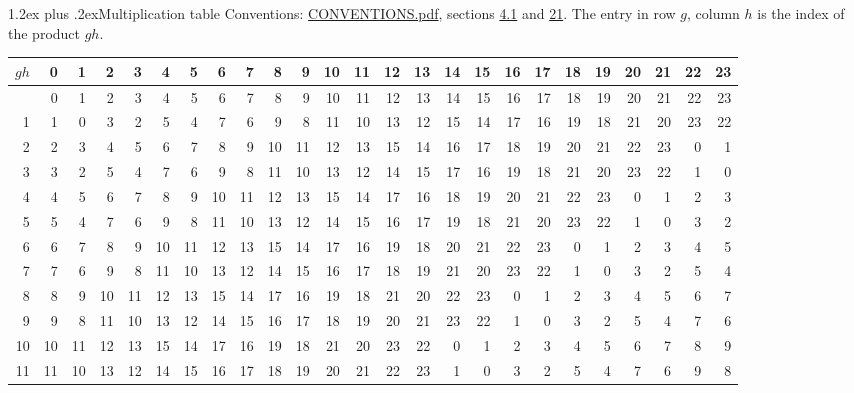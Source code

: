 \documentclass[10pt,a4paper]{article}
\makeatletter
\renewcommand\section{\@startsection{section}{1}{\z@}{-3ex plus -1ex minus -.2ex}%
  {1.2ex plus .2ex}{\normalfont\large\sffamily\bfseries\color{parttitle}}}
\numberwithin{equation}{section}
\makeatother
\begin{document}
\section{Multiplication table}\label{s:multiplication}
Conventions: \href{../../CONVENTIONS.pdf}{CONVENTIONS.pdf}, sections \href{../../../rotation/CONVENTIONS.pdf\#conv.4.1}{4.1} and \href{../../CONVENTIONS.pdf\#conv.21}{21}.
The entry in row $g$, column $h$ is the index of the product $gh$.
{\normalsize\setlength{\tabcolsep}{0.1em}\setlength{\LTleft}{-8pt plus 1fill}\setlength{\LTright}{-8pt plus 1fill}\begin{longtable}{@{}r|rrrrrrrrrrrrrrrrrrrrrrrr@{}}\toprule
$gh$ & 0 & 1 & 2 & 3 & 4 & 5 & 6 & 7 & 8 & 9 & 10 & 11 & 12 & 13 & 14 & 15 & 16 & 17 & 18 & 19 & 20 & 21 & 22 & 23\\\midrule\endhead
\bottomrule\endfoot\endlastfoot
0 & 0 & 1 & 2 & 3 & 4 & 5 & 6 & 7 & 8 & 9 & 10 & 11 & 12 & 13 & 14 & 15 & 16 & 17 & 18 & 19 & 20 & 21 & 22 & 23\\*
1 & 1 & 0 & 3 & 2 & 5 & 4 & 7 & 6 & 9 & 8 & 11 & 10 & 13 & 12 & 15 & 14 & 17 & 16 & 19 & 18 & 21 & 20 & 23 & 22\\
2 & 2 & 3 & 4 & 5 & 6 & 7 & 8 & 9 & 10 & 11 & 12 & 13 & 15 & 14 & 16 & 17 & 18 & 19 & 20 & 21 & 22 & 23 & 0 & 1\\
3 & 3 & 2 & 5 & 4 & 7 & 6 & 9 & 8 & 11 & 10 & 13 & 12 & 14 & 15 & 17 & 16 & 19 & 18 & 21 & 20 & 23 & 22 & 1 & 0\\
4 & 4 & 5 & 6 & 7 & 8 & 9 & 10 & 11 & 12 & 13 & 15 & 14 & 17 & 16 & 18 & 19 & 20 & 21 & 22 & 23 & 0 & 1 & 2 & 3\\
5 & 5 & 4 & 7 & 6 & 9 & 8 & 11 & 10 & 13 & 12 & 14 & 15 & 16 & 17 & 19 & 18 & 21 & 20 & 23 & 22 & 1 & 0 & 3 & 2\\
6 & 6 & 7 & 8 & 9 & 10 & 11 & 12 & 13 & 15 & 14 & 17 & 16 & 19 & 18 & 20 & 21 & 22 & 23 & 0 & 1 & 2 & 3 & 4 & 5\\
7 & 7 & 6 & 9 & 8 & 11 & 10 & 13 & 12 & 14 & 15 & 16 & 17 & 18 & 19 & 21 & 20 & 23 & 22 & 1 & 0 & 3 & 2 & 5 & 4\\
8 & 8 & 9 & 10 & 11 & 12 & 13 & 15 & 14 & 17 & 16 & 19 & 18 & 21 & 20 & 22 & 23 & 0 & 1 & 2 & 3 & 4 & 5 & 6 & 7\\
9 & 9 & 8 & 11 & 10 & 13 & 12 & 14 & 15 & 16 & 17 & 18 & 19 & 20 & 21 & 23 & 22 & 1 & 0 & 3 & 2 & 5 & 4 & 7 & 6\\
10 & 10 & 11 & 12 & 13 & 15 & 14 & 17 & 16 & 19 & 18 & 21 & 20 & 23 & 22 & 0 & 1 & 2 & 3 & 4 & 5 & 6 & 7 & 8 & 9\\
11 & 11 & 10 & 13 & 12 & 14 & 15 & 16 & 17 & 18 & 19 & 20 & 21 & 22 & 23 & 1 & 0 & 3 & 2 & 5 & 4 & 7 & 6 & 9 & 8\\

\end{longtable}}
\end{document}
